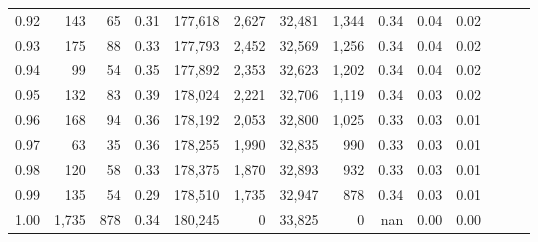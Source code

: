 \begin{tabular}{rrrrrrrrrrrrrr}
0.92 &    143 &   65 &  0.31 &  177,618 &    2,627 &  32,481 &   1,344 &  0.34 &  0.04 &      0.02 \\
0.93 &    175 &   88 &  0.33 &  177,793 &    2,452 &  32,569 &   1,256 &  0.34 &  0.04 &      0.02 \\
0.94 &     99 &   54 &  0.35 &  177,892 &    2,353 &  32,623 &   1,202 &  0.34 &  0.04 &      0.02 \\
0.95 &    132 &   83 &  0.39 &  178,024 &    2,221 &  32,706 &   1,119 &  0.34 &  0.03 &      0.02 \\
0.96 &    168 &   94 &  0.36 &  178,192 &    2,053 &  32,800 &   1,025 &  0.33 &  0.03 &      0.01 \\
0.97 &     63 &   35 &  0.36 &  178,255 &    1,990 &  32,835 &     990 &  0.33 &  0.03 &      0.01 \\
0.98 &    120 &   58 &  0.33 &  178,375 &    1,870 &  32,893 &     932 &  0.33 &  0.03 &      0.01 \\
0.99 &    135 &   54 &  0.29 &  178,510 &    1,735 &  32,947 &     878 &  0.34 &  0.03 &      0.01 \\
1.00 &  1,735 &  878 &  0.34 &  180,245 &        0 &  33,825 &       0 &   nan &  0.00 &      0.00 \\
\bottomrule
\end{tabular}
